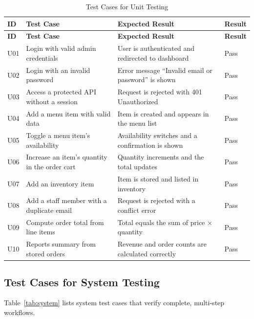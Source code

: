 \documentclass[12pt,a4paper]{report}
\begin{document}
\begin{longtable}{|p{1.2cm}|p{4.2cm}|p{4.4cm}|p{2.2cm}|}
\caption{Test Cases for Unit Testing}\label{tab:unit}\\
\hline
\textbf{ID} & \textbf{Test Case} & \textbf{Expected Result} & \textbf{Result} \\ \hline
\endfirsthead
\hline
\textbf{ID} & \textbf{Test Case} & \textbf{Expected Result} & \textbf{Result} \\ \hline
\endhead
\hline
\endfoot
U01 & Login with valid admin credentials & User is authenticated and redirected to dashboard & Pass \\ \hline
U02 & Login with an invalid password & Error message ``Invalid email or password'' is shown & Pass \\ \hline
U03 & Access a protected API without a session & Request is rejected with 401 Unauthorized & Pass \\ \hline
U04 & Add a menu item with valid data & Item is created and appears in the menu list & Pass \\ \hline
U05 & Toggle a menu item's availability & Availability switches and a confirmation is shown & Pass \\ \hline
U06 & Increase an item's quantity in the order cart & Quantity increments and the total updates & Pass \\ \hline
U07 & Add an inventory item & Item is stored and listed in inventory & Pass \\ \hline
U08 & Add a staff member with a duplicate email & Request is rejected with a conflict error & Pass \\ \hline
U09 & Compute order total from line items & Total equals the sum of price $\times$ quantity & Pass \\ \hline
U10 & Reports summary from stored orders & Revenue and order counts are calculated correctly & Pass \\ \hline
\end{longtable}

\subsection{Test Cases for System Testing}
Table~\ref{tab:system} lists system test cases that verify complete, multi-step workflows.
\end{document}
